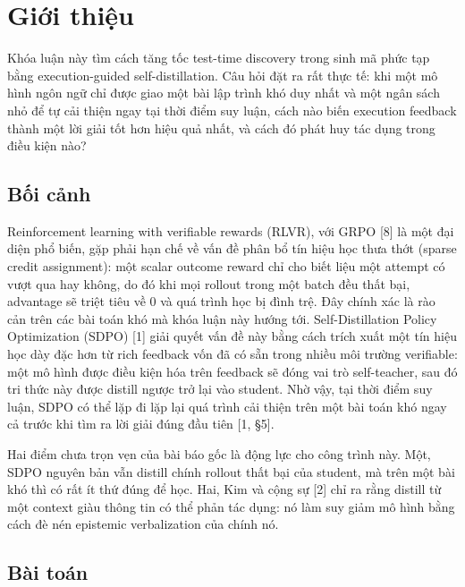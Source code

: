 \chapter{Giới thiệu}\label{chapter-1-introduction}

Khóa luận này tìm cách tăng tốc test-time discovery trong sinh mã phức tạp bằng execution-guided self-distillation. Câu hỏi đặt ra rất thực tế: khi một mô hình ngôn ngữ chỉ được giao một bài lập trình khó duy nhất và một ngân sách nhỏ để tự cải thiện ngay tại thời điểm suy luận, cách nào biến execution feedback thành một lời giải tốt hơn hiệu quả nhất, và cách đó phát huy tác dụng trong điều kiện nào?

\section{Bối cảnh}\label{background}

Reinforcement learning with verifiable rewards (RLVR), với GRPO {[}8{]} là một đại diện phổ biến, gặp phải hạn chế về vấn đề phân bổ tín hiệu học thưa thớt (sparse credit assignment): một scalar outcome reward chỉ cho biết liệu một attempt có vượt qua hay không, do đó khi mọi rollout trong một batch đều thất bại, advantage sẽ triệt tiêu về 0 và quá trình học bị đình trệ. Đây chính xác là rào cản trên các bài toán khó mà khóa luận này hướng tới. Self-Distillation Policy Optimization (SDPO) {[}1{]} giải quyết vấn đề này bằng cách trích xuất một tín hiệu học dày đặc hơn từ rich feedback vốn đã có sẵn trong nhiều môi trường verifiable: một mô hình được điều kiện hóa trên feedback sẽ đóng vai trò self-teacher, sau đó tri thức này được distill ngược trở lại vào student. Nhờ vậy, tại thời điểm suy luận, SDPO có thể lặp đi lặp lại quá trình cải thiện trên một bài toán khó ngay cả trước khi tìm ra lời giải đúng đầu tiên {[}1, §5{]}.

Hai điểm chưa trọn vẹn của bài báo gốc là động lực cho công trình này. Một, SDPO nguyên bản vẫn distill chính rollout thất bại của student, mà trên một bài khó thì có rất ít thứ đúng để học. Hai, Kim và cộng sự {[}2{]} chỉ ra rằng distill từ một context giàu thông tin có thể phản tác dụng: nó làm suy giảm mô hình bằng cách đè nén epistemic verbalization của chính nó.

\section{Bài toán}\label{problem}

